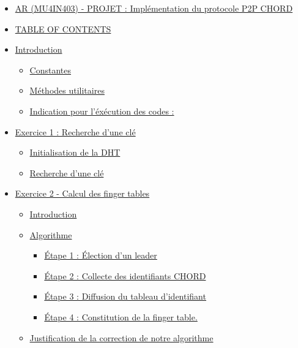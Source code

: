 \documentclass[
]{article}
\providecommand{\tightlist}{%
  \setlength{\itemsep}{0pt}\setlength{\parskip}{0pt}}
\begin{document}
\begin{itemize}
\tightlist
\item
  \protect\hyperlink{ar-mu4in403----projet--impluxe9mentation-du-protocole-p2p-chord}{AR
  (MU4IN403) - PROJET : Implémentation du protocole P2P CHORD}
\item
  \protect\hyperlink{table-of-contents}{TABLE OF CONTENTS}
\item
  \protect\hyperlink{introduction}{Introduction}

  \begin{itemize}
  \tightlist
  \item
    \protect\hyperlink{constantes}{Constantes}
  \item
    \protect\hyperlink{muxe9thodes-utilitaires}{Méthodes utilitaires}
  \item
    \protect\hyperlink{indication-pour-luxe9xuxe9cution-des-codes-}{Indication
    pour l'éxécution des codes :}
  \end{itemize}
\item
  \protect\hyperlink{exercice-1--recherche-dune-cluxe9}{Exercice 1 :
  Recherche d'une clé}

  \begin{itemize}
  \tightlist
  \item
    \protect\hyperlink{initialisation-de-la-dht}{Initialisation de la
    DHT}
  \item
    \protect\hyperlink{recherche-dune-cluxe9}{Recherche d'une clé}
  \end{itemize}
\item
  \protect\hyperlink{exercice-2---calcul-des-finger-tables}{Exercice 2 -
  Calcul des finger tables}

  \begin{itemize}
  \tightlist
  \item
    \protect\hyperlink{introduction-1}{Introduction}
  \item
    \protect\hyperlink{algorithme}{Algorithme}

    \begin{itemize}
    \tightlist
    \item
      \protect\hyperlink{uxe9tape-1--uxe9lection-dun-leader}{Étape 1 :
      Élection d'un leader}
    \item
      \protect\hyperlink{uxe9tape-2--collecte-des-identifiants-chord}{Étape
      2 : Collecte des identifiants CHORD}
    \item
      \protect\hyperlink{uxe9tape-3--diffusion-du-tableau-didentifiant}{Étape
      3 : Diffusion du tableau d'identifiant}
    \item
      \protect\hyperlink{uxe9tape-4--constitution-de-la-finger-table}{Étape
      4 : Constitution de la finger table.}
    \end{itemize}
  \item
    \protect\hyperlink{justification-de-la-correction-de-notre-algorithme}{Justification
    de la correction de notre algorithme}


\end{itemize}
\end{itemize}
\end{document}
